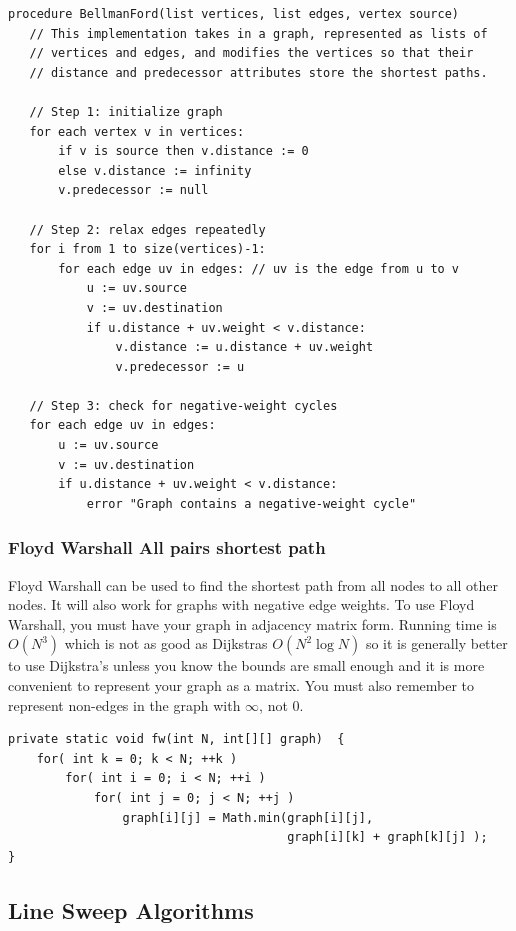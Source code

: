 \documentclass[a4paper,12pt]{article}
\begin{document}
\begin{lstlisting}
procedure BellmanFord(list vertices, list edges, vertex source)
   // This implementation takes in a graph, represented as lists of 
   // vertices and edges, and modifies the vertices so that their 
   // distance and predecessor attributes store the shortest paths.

   // Step 1: initialize graph
   for each vertex v in vertices:
       if v is source then v.distance := 0
       else v.distance := infinity
       v.predecessor := null

   // Step 2: relax edges repeatedly
   for i from 1 to size(vertices)-1:
       for each edge uv in edges: // uv is the edge from u to v
           u := uv.source
           v := uv.destination
           if u.distance + uv.weight < v.distance:
               v.distance := u.distance + uv.weight
               v.predecessor := u

   // Step 3: check for negative-weight cycles
   for each edge uv in edges:
       u := uv.source
       v := uv.destination
       if u.distance + uv.weight < v.distance:
           error "Graph contains a negative-weight cycle"
\end{lstlisting}

\subsubsection{Floyd Warshall All pairs shortest path}

Floyd Warshall can be used to find the shortest path from all nodes to all other nodes. It will also work for graphs with negative edge weights. To use Floyd Warshall, you must have your graph in adjacency matrix form. Running time is $O(N^3)$ which is not as good as Dijkstras $O(N^2\log N)$ so it is generally better to use Dijkstra's unless you know the bounds are small enough and it is more convenient to represent your graph as a matrix. You must also remember to represent non-edges in the graph with $\infty$, not 0.

\begin{lstlisting}
private static void fw(int N, int[][] graph)  {
	for( int k = 0; k < N; ++k )
	    for( int i = 0; i < N; ++i )
			for( int j = 0; j < N; ++j )
				graph[i][j] = Math.min(graph[i][j], 
									   graph[i][k] + graph[k][j] );
}
\end{lstlisting}

\subsection{Line Sweep Algorithms}
\end{document}
